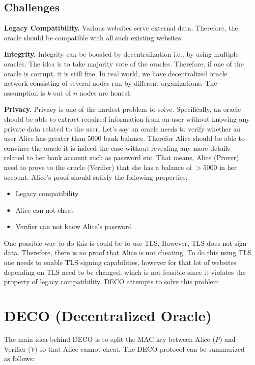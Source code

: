 \documentclass[twoside]{article}
\begin{document}
	\subsection{Challenges}
	\textbf{Legacy Compatibility.}
	Various websites serve external data. 
	Therefore, the oracle should be compatible with all such existing websites.
	
	\textbf{Integrity.} 
	Integrity can be boosted by decentralization i.e., by using multiple oracles. The idea is to take majority vote of the oracles. Therefore, if one of the oracle is corrupt, it is still fine. In real world, we have decentralized oracle network consisting of several nodes run by different organizations. The assumption is $k$ out of $n$ nodes are honest.
	
	\textbf{Privacy.}
	Privacy is one of the hardest problem to solve. Specifically, an oracle should be able to extract required information from an user without knowing any private data related to the user.
	Let's say an oracle needs to verify whether an user Alice has greater than $5000$ bank balance. Therefor Alice should be able to convince the oracle it is indeed the case without revealing any more details related to her bank account such as password etc.
	That means, Alice (Prover) need to prove to the oracle (Verifier) that she has a balance of $> 5000$ in her account. Alice's proof should satisfy the following properties:
	\begin{itemize}
		\item Legacy compatibility
		\item Alice can not cheat
		\item  Verifier can not know Alice's password
	\end{itemize}
	One possible way to do this is could be to use TLS. However, TLS does not sign data. Therefore, there is no proof that Alice is not cheating. 
	To do this using TLS one needs to enable TLS signing capabilities, however for that lot of websites depending on TLS need to be changed, which is not feasible since it violates the property of legacy compatibility.
	DECO attempts to solve this problem
	
	\section{DECO (Decentralized Oracle)}
	The main idea behind DECO is to split the MAC key between Alice ($P$) and Verifier ($V$) so that Alice cannot cheat. The DECO protocol can be summarized as follows:
	
\end{document}
